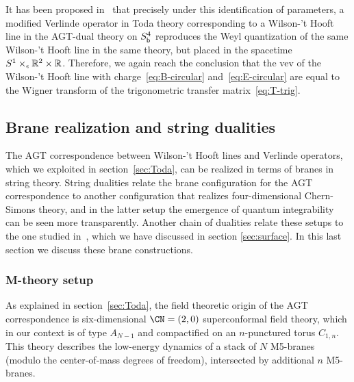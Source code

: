 It has been proposed in~\cite{Ito:2011ea} that precisely under this
identification of parameters, a modified Verlinde operator in Toda
theory corresponding to a Wilson-'t Hooft line in the AGT-dual theory
on $S^4_{\mathsf{b}}$ reproduces the Weyl quantization of the same Wilson-'t
Hooft line in the same theory, but placed in the spacetime
$S^1 \times_\epsilon \mathbb{R}^2 \times \mathbb{R}$.  Therefore, we again reach the
conclusion that the vev of the Wilson-'t Hooft line with
charge~\eqref{eq:B-circular} and~\eqref{eq:E-circular} are equal to
the Wigner transform of the trigonometric transfer
matrix~\eqref{eq:T-trig}.









\subsection{Brane realization and string dualities}
\label{sec:branes}

The AGT correspondence between Wilson-'t Hooft lines and Verlinde
operators, which we exploited in section~\ref{sec:Toda}, can be
realized in terms of branes in string theory.  String dualities relate
the brane configuration for the AGT correspondence to another
configuration that realizes four-dimensional Chern-Simons theory, and
in the latter setup the emergence of quantum integrability can be seen
more transparently.  Another chain of dualities relate these setups to
the one studied in~\cite{Maruyoshi:2016caf, Yagi:2017hmj}, which
we have discussed in section \ref{sec:surface}.  In this last
section we discuss these brane constructions.





\subsubsection{M-theory setup} %

As explained in section~\ref{sec:Toda}, the field theoretic origin of
the AGT correspondence is six-dimensional $\CN = (2,0)$ superconformal
field theory, which in our context is of type $A_{N-1}$ and
compactified on an $n$-punctured torus $C_{1,n}$.  This theory
describes the low-energy dynamics of a stack of $N$ M5-branes (modulo
the center-of-mass degrees of freedom), intersected by additional $n$ M5-branes.

